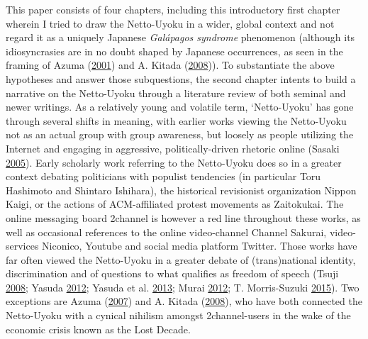 \documentclass[10pt,british,A4paper,,openany]{memoir}
\begin{document}
This paper consists of four chapters, including this introductory first
chapter wherein I tried to draw the Netto-Uyoku in a wider, global
context and not regard it as a uniquely Japanese \emph{Galápagos
syndrome} phenomenon (although its idiosyncrasies are in no doubt shaped
by Japanese occurrences, as seen in the framing of Azuma
(\protect\hyperlink{ref-azuma_otaku:_2001}{2001}) and A. Kitada
(\protect\hyperlink{ref-kitada__2008}{2008})). To substantiate the above
hypotheses and answer those subquestions, the second chapter intents to
build a narrative on the Netto-Uyoku through a literature review of both
seminal and newer writings. As a relatively young and volatile term,
`Netto-Uyoku' has gone through several shifts in meaning, with earlier
works viewing the Netto-Uyoku not as an actual group with group
awareness, but loosely as people utilizing the Internet and engaging in
aggressive, politically-driven rhetoric online (Sasaki
\protect\hyperlink{ref-sasaki_netto-uyoku_2005}{2005}). Early scholarly
work referring to the Netto-Uyoku does so in a greater context debating
politicians with populist tendencies (in particular Toru Hashimoto and
Shintaro Ishihara), the historical revisionist organization Nippon
Kaigi, or the actions of ACM-affiliated protest movements as Zaitokukai.
The online messaging board 2channel is however a red line throughout
these works, as well as occasional references to the online
video-channel Channel Sakurai, video-services Niconico, Youtube and
social media platform Twitter. Those works have far often viewed the
Netto-Uyoku in a greater debate of (trans)national identity,
discrimination and of questions to what qualifies as freedom of speech
(Tsuji \protect\hyperlink{ref-tsuji_eng:_2008}{2008}; Yasuda
\protect\hyperlink{ref-yasuda_eng:_2012}{2012}; Yasuda et al.
\protect\hyperlink{ref-yasuda_:_2013}{2013}; Murai
\protect\hyperlink{ref-murai_net_2012}{2012}; T. Morris-Suzuki
\protect\hyperlink{ref-morris-suzuki_beyond_2015}{2015}). Two exceptions
are Azuma (\protect\hyperlink{ref-azuma__2007}{2007}) and A. Kitada
(\protect\hyperlink{ref-kitada__2008}{2008}), who have both connected
the Netto-Uyoku with a cynical nihilism amongst 2channel-users in the
wake of the economic crisis known as the Lost Decade.
\end{document}
